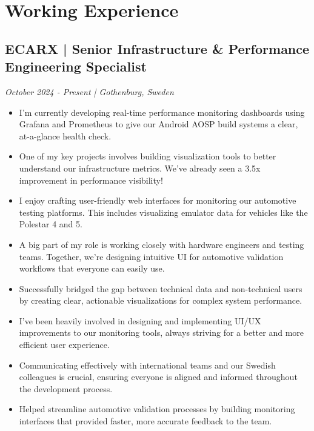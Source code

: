 \documentclass[11pt,a4paper]{article}
\begin{document}
\section*{Working Experience}

\subsection*{ECARX | Senior Infrastructure \& Performance Engineering Specialist}
\textit{October 2024 - Present | Gothenburg, Sweden}
\begin{itemize}[noitemsep]
\item I'm currently developing real-time performance monitoring dashboards using Grafana and Prometheus to give our Android AOSP build systems a clear, at-a-glance health check.
\item One of my key projects involves building visualization tools to better understand our infrastructure metrics. We've already seen a 3.5x improvement in performance visibility!
\item I enjoy crafting user-friendly web interfaces for monitoring our automotive testing platforms. This includes visualizing emulator data for vehicles like the Polestar 4 and 5.
\item A big part of my role is working closely with hardware engineers and testing teams. Together, we're designing intuitive UI for automotive validation workflows that everyone can easily use.
\item Successfully bridged the gap between technical data and non-technical users by creating clear, actionable visualizations for complex system performance.
\item I've been heavily involved in designing and implementing UI/UX improvements to our monitoring tools, always striving for a better and more efficient user experience.
\item Communicating effectively with international teams and our Swedish colleagues is crucial, ensuring everyone is aligned and informed throughout the development process.
\item Helped streamline automotive validation processes by building monitoring interfaces that provided faster, more accurate feedback to the team.
\end{itemize}
\end{document}
